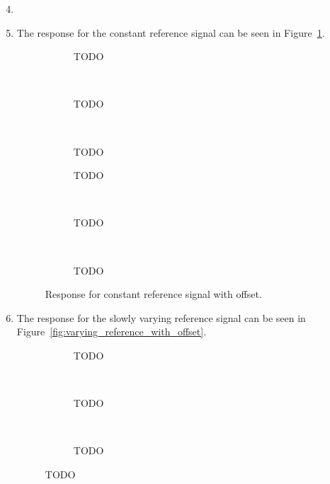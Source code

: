 \documentclass[11pt]{article}
\begin{document}
\begin{enumerate}
    \setcounter{enumi}{3}
    \item

    \item The response for the constant reference signal can be seen in
    Figure~\ref{fig:constant_reference_with_offset}.
    \begin{figure}[ht]
        \centering
        \begin{subfigure}[c]{0.3\linewidth}
            \centering
            \caption{TODO}
        \end{subfigure}
        ~
        \begin{subfigure}[c]{0.3\linewidth}
            \centering
            \caption{TODO}
        \end{subfigure}
        ~
        \begin{subfigure}[c]{0.3\linewidth}
            \centering
            \caption{TODO}
        \end{subfigure}

        \begin{subfigure}[c]{0.3\linewidth}
            \centering
            \caption{TODO}
        \end{subfigure}
        ~
        \begin{subfigure}[c]{0.3\linewidth}
            \centering
            \caption{TODO}
        \end{subfigure}
        ~
        \begin{subfigure}[c]{0.3\linewidth}
            \centering
            \caption{TODO}
        \end{subfigure}
        \caption{Response for constant reference signal with offset.}
        \label{fig:constant_reference_with_offset}
    \end{figure}

    \item The response for the slowly varying reference signal can be seen in
    Figure~\ref{fig:varying_reference_with_offset}.
    \begin{figure}[ht]
        \centering
        \begin{subfigure}[c]{0.3\linewidth}
            \centering
            \caption{TODO}
        \end{subfigure}
        ~
        \begin{subfigure}[c]{0.3\linewidth}
            \centering
            \caption{TODO}
        \end{subfigure}
        ~
        \begin{subfigure}[c]{0.3\linewidth}
            \centering
            \caption{TODO}
        \end{subfigure}


\end{figure}
\end{enumerate}
\end{document}
